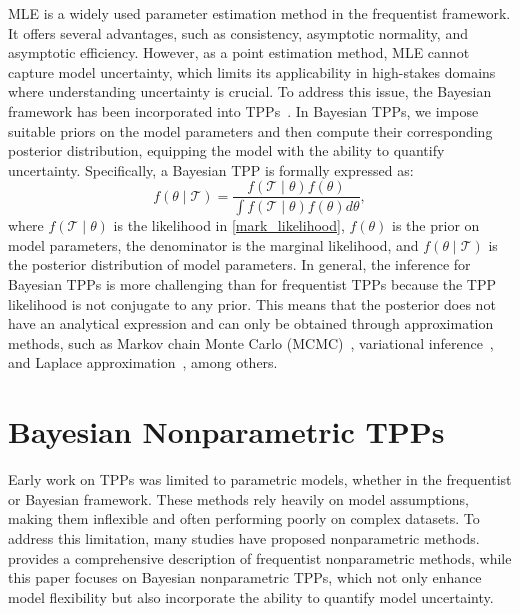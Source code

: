 \documentclass[10pt]{article} %
\begin{document}
MLE is a widely used parameter estimation method in the frequentist framework. It offers several advantages, such as consistency, asymptotic normality, and asymptotic efficiency. However, as a point estimation method, MLE cannot capture model uncertainty, which limits its applicability in high-stakes domains where understanding uncertainty is crucial. 
To address this issue, the Bayesian framework has been incorporated into TPPs~\citep{raftery1986bayesian}. 
In Bayesian TPPs, we impose suitable priors on the model parameters and then compute their corresponding posterior distribution, equipping the model with the ability to quantify uncertainty. Specifically, a Bayesian TPP is formally expressed as: 
\begin{equation}
    f(\theta\mid \mathcal{T})=\frac{f(\mathcal{T}\mid \theta)f(\theta)}{\int f(\mathcal{T}\mid \theta)f(\theta)d\theta},
\end{equation}
where \( f(\mathcal{T}\mid \theta) \) is the likelihood in \cref{mark_likelihood}, \( f(\theta) \) is the prior on model parameters, the denominator is the marginal likelihood, and \( f(\theta\mid \mathcal{T}) \) is the posterior distribution of model parameters. 
In general, the inference for Bayesian TPPs is more challenging than for frequentist TPPs because the TPP likelihood is not conjugate to any prior. This means that the posterior does not have an analytical expression and can only be obtained through approximation methods, such as Markov chain Monte Carlo (MCMC)~\citep{deutsch2022bayesian,rasmussen2013bayesian}, variational inference~\citep{lloyd2015variational,zammit2012variational}, and Laplace approximation~\citep{hossain2009approximate,illian2013fitting}, among others. 





\section{Bayesian Nonparametric TPPs}

\label{bayedian_nonp_tpp}

Early work on TPPs was limited to parametric models, whether in the frequentist or Bayesian framework. These methods rely heavily on model assumptions, making them inflexible and often performing poorly on complex datasets. To address this limitation, many studies have proposed nonparametric methods. 
\citet{yan2019recent} provides a comprehensive description of frequentist nonparametric methods, while this paper focuses on Bayesian nonparametric TPPs, which not only enhance model flexibility but also incorporate the ability to quantify model uncertainty.  
\end{document}
